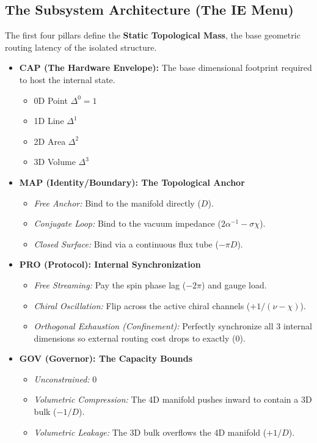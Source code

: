 \subsection{The Subsystem Architecture (The IE Menu)}

The first four pillars define the \textbf{Static Topological Mass}, the base geometric routing latency of the isolated structure.
\begin{itemize}
    \item \textbf{CAP (The Hardware Envelope):} The base dimensional footprint required to host the internal state. 
    \begin{itemize}
      \item{0D Point} $\Delta^0 = 1$
      \item{1D Line} $\Delta^1$
      \item{2D Area} $\Delta^2$
      \item{3D Volume} $\Delta^3$
    \end{itemize}

    \item \textbf{MAP (Identity/Boundary): The Topological Anchor}
    \begin{itemize}
        \item \textit{Free Anchor:} Bind to the manifold directly ($D$).
        \item \textit{Conjugate Loop:} Bind to the vacuum impedance ($2\alpha^{-1} - \sigma\chi$).
        \item \textit{Closed Surface:} Bind via a continuous flux tube ($-\pi D$).
    \end{itemize}

    \item \textbf{PRO (Protocol): Internal Synchronization}
    \begin{itemize}
        \item \textit{Free Streaming:} Pay the spin phase lag ($-2\pi$) and gauge load.
        \item \textit{Chiral Oscillation:} Flip across the active chiral channels ($+1/(\nu-\chi)$).
        \item \textit{Orthogonal Exhaustion (Confinement):} Perfectly synchronize all 3 internal dimensions so external routing cost drops to exactly ($0$).
    \end{itemize}

    \item \textbf{GOV (Governor): The Capacity Bounds}
    \begin{itemize}
        \item \textit{Unconstrained:} $0$
        \item \textit{Volumetric Compression:} The 4D manifold pushes inward to contain a 3D bulk ($-1/D$).
        \item \textit{Volumetric Leakage:} The 3D bulk overflows the 4D manifold ($+1/D$).
    \end{itemize}
\end{itemize}

